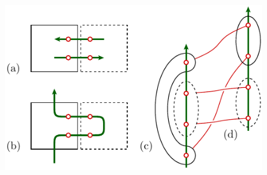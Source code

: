 \documentclass[aps, prl, letterpaper, twocolumn, superscriptaddress, notitlepage, 10pt]{revtex4}
\begin{document}
\begin{figure}[t!]
\begin{center}
	\includegraphics[width=0.8\columnwidth]{pic-syndrome.pdf} %

\end{center}
\end{figure}
\end{document}
